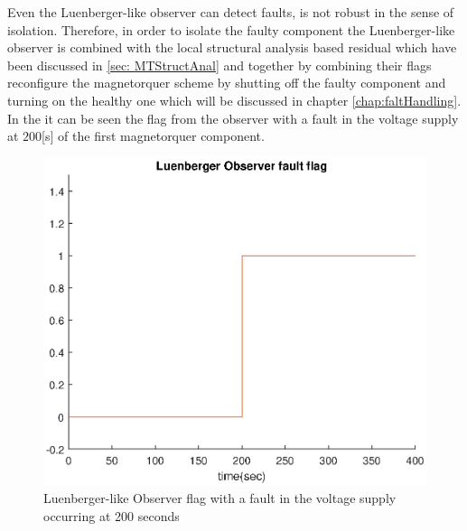 %
 Even the Luenberger-like observer can detect faults, is not robust in the sense of isolation. Therefore, in order to isolate the faulty component the  Luenberger-like observer is combined with the local structural analysis based residual which have been discussed in \ref{sec: MTStructAnal} and together by combining their flags reconfigure the magnetorquer scheme by shutting off the faulty component and turning on the healthy one which will be discussed in chapter \ref{chap:faltHandling}. In the  it can be seen the flag from the observer with a fault in the voltage supply at $200$[s] of the first magnetorquer component. 
 \begin{figure}[H]
 	\centering
 	\includegraphics[width=0.9\linewidth]{figures/Luenberger_Observerflag}
 	\caption{Luenberger-like Observer flag with a fault in the voltage supply occurring at 200 seconds   }
 	\label{fig:obsflag}
 \end{figure}

%